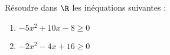 \documentclass[a4paper,11pt,exos]{nsi} %
\begin{document}



\maketitle

\begin{exercice}
    Résoudre dans $\R$ les inéquations suivantes :
    \begin{multicols}{2}
        \begin{enumerate}
            \item $-5x^2+10x-8\geqslant 0$
            \item $-2x^2-4x+16\geqslant 0$
        \end{enumerate}
    \end{multicols}
    
\end{exercice}
\end{document}
